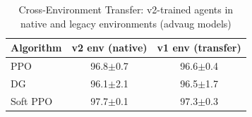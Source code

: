 \begin{table}[h]
\centering
\caption{Cross-Environment Transfer: v2-trained agents in native and legacy environments (advaug models)}
\label{tab:cross_env}
\begin{tabular}{lcc}
\toprule
Algorithm & v2 env (native) & v1 env (transfer) \\
\midrule
  PPO & 96.8$\pm$0.7 & 96.6$\pm$0.4 \\
  DG & 96.1$\pm$2.1 & 96.5$\pm$1.7 \\
  Soft PPO & 97.7$\pm$0.1 & 97.3$\pm$0.3 \\
\bottomrule
\end{tabular}
\end{table}